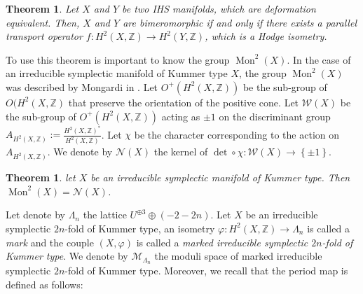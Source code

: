 \documentclass{alggeom}
\DeclareMathOperator{\Mon}{Mon}
\newcommand{\Z}{\mathbb{Z}}
\theoremstyle{plain}
\newtheorem{thm}[theorem]{Theorem}
\theoremstyle{definition}
\theoremstyle{remark}
\begin{document}
\begin{thm}\cite[Theorem 1.3]{Markmansurvey} \label{Torelli}
Let $X$ and $Y$ be two IHS manifolds, which are deformation equivalent.
Then,
$X$ and $Y$ are bimeromorphic if and only if there exists a parallel transport operator $f : H^2(X,\Z) \to H^2(Y,\Z)$, which is a Hodge isometry.
\end{thm}

To use this theorem is important to know the group $\Mon^2(X)$. In the  case of an irreducible symplectic manifold of Kummer type $X$, the group $\Mon^2(X)$ was described by Mongardi in \cite{MongardiMono}. Let $O^{+}(H^2(X,\Z))$ be the sub-group of $O(H^2(X,\Z)$ that preserve the orientation of the positive cone. Let $\mathcal{W}(X)$ be the sub-group of $O^{+}(H^2(X,\Z))$ acting as $\pm1$ on the discriminant group $A_{H^{2}(X,\Z)}:=\frac{H^{2}(X,\Z)^{*}}{H^{2}(X,\Z)}$. Let $\chi$ be the character corresponding to the action on $A_{H^{2}(X,\Z)}$. We denote by $\mathcal{N}(X)$ the kernel of $\det\circ \chi:\mathcal{W}(X)\rightarrow \left\{\pm1\right\}$.
\begin{thm}\cite[Theorem 2.3]{MongardiMono}\label{MonodromyMong}
let $X$ be an irreducible symplectic manifold of Kummer type. Then $\Mon^2(X)=\mathcal{N}(X)$.
\end{thm}
Let denote by $\Lambda_n$ the lattice $U^{\oplus 3}\oplus(-2-2n)$. Let $X$ be an irreducible symplectic $2n$-fold of Kummer type, an isometry $\varphi:H^2(X,\Z)\rightarrow \Lambda_n$ is called a \emph{mark} and the couple $(X,\varphi)$ is called a \emph{marked irreducible symplectic $2n$-fold of Kummer type}. We denote by $\mathcal{M}_{\Lambda_n}$ the moduli space of marked irreducible symplectic $2n$-fold of Kummer type. Moreover, we recall that the period map is defined as follows:
\end{document}
